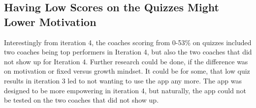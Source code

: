   \subsection{Having Low Scores on the Quizzes Might Lower Motivation}
  Interestingly from iteration 4, the coaches scoring from 0-53\% on quizzes included two coaches being top performers in Iteration 4, but also the two coaches that did not show up for Iteration 4. Further research could be done, if the difference was on motivation or fixed versus growth mindset. It could be for some, that low quiz results in iteration 3 led to not wanting to use the app any more. The app was designed to be more empowering in iteration 4, but naturally, the app could not be tested on the two coaches that did not show up.
